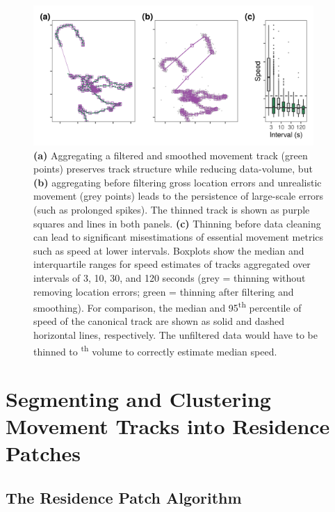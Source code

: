 \documentclass[10pt,paper=a4,headings=standardclasses
]{scrartcl}
\begin{document}
\begin{figure}[h!]
    \centering
    \includegraphics[width=0.95\textwidth]{figures/fig_04_thinning.png}
    \caption{\textbf{(a)} Aggregating a filtered and smoothed movement track (green points) preserves track structure while reducing data-volume, but \textbf{(b)} aggregating before filtering gross location errors and unrealistic movement (grey points) leads to the persistence of large-scale errors (such as prolonged spikes).
    The thinned track is shown as purple squares and lines in both panels.
    \textbf{(c)} Thinning before data cleaning can lead to significant misestimations of essential movement metrics such as speed at lower intervals.
    Boxplots show the median and interquartile ranges for speed estimates of tracks aggregated over intervals of 3, 10, 30, and 120 seconds (grey = thinning without removing location errors; green = thinning after filtering and smoothing).
    For comparison, the median and 95\textsuperscript{th} percentile of speed of the canonical track are shown as solid and dashed horizontal lines, respectively.
    The unfiltered data would have to be thinned to \textsuperscript{th} volume to correctly estimate median speed.}
    \label{fig:figure_thinning}
\end{figure}

\section{Segmenting and Clustering Movement Tracks into Residence Patches}

\subsection{The Residence Patch Algorithm}
\end{document}
